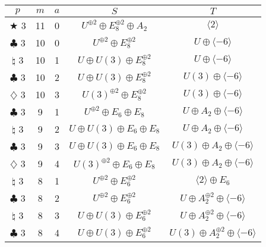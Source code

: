 \documentclass{amsart}
\theoremstyle{definition}
\begin{document}
 \begin{table}[p]
 \begin{tabular}{c|c|c|c|c}
 $p$&$m$&$a$&$S$&$T$\\
 \hline
 
 $\bigstar$ 3&11&0&$U^{\oplus 2}\oplus E_8^{\oplus 2}\oplus A_2$&$\langle 2\rangle$\\
 \hline
 
 $\clubsuit$ 3&10&0& $U^{\oplus 2} \oplus E_8^{\oplus 2}$&$U\oplus \langle -6\rangle$\\
 
 $\natural$ 3&10&1& $U \oplus U(3) \oplus E_8^{\oplus 2}$&$U\oplus \langle -6\rangle$\\
 
 $\clubsuit$ 3&10&2&$U \oplus U(3) \oplus E_8^{\oplus 2}$&$U(3)\oplus\langle -6\rangle$\\
 
 $\diamondsuit$ 3&10&3&$U(3)^{\oplus 2} \oplus E_8^{\oplus 2}$&$U(3)\oplus\langle -6\rangle$\\
 \hline
 
 $\clubsuit$ 3&9&1&$U^{\oplus 2} \oplus E_6\oplus E_8$&$U\oplus A_2\oplus \langle -6\rangle$\\
 
 $\natural$ 3&9&2&$U\oplus U(3) \oplus E_6\oplus E_8$&$U\oplus A_2\oplus \langle -6\rangle$\\
 
 $\clubsuit$ 3&9&3&$U\oplus U(3)\oplus E_6\oplus E_8$&$U(3)\oplus A_2\oplus \langle -6\rangle$\\
 
 $\diamondsuit$ 3&9&4&$U(3)^{\oplus 2}\oplus E_6\oplus E_8$&$U(3)\oplus A_2\oplus \langle -6\rangle$\\

 \hline
 
 $\natural$ 3&8&1&$U^{\oplus 2} \oplus E_6^{\oplus 2}$&$\langle 2\rangle \oplus E_6$\\
 
 $\clubsuit$ 3&8&2&$U^{\oplus 2} \oplus E_6^{\oplus 2}$&$U\oplus A_2^{\oplus 2} \oplus \langle -6\rangle$\\
 
 $\natural$ 3&8&3&$U\oplus U(3)\oplus E_6^{\oplus 2}$&$U\oplus A_2^{\oplus 2} \oplus \langle -6\rangle$\\
 
 $\clubsuit$ 3&8&4&$U\oplus U(3)\oplus E_6^{\oplus 2}$&$U(3)\oplus A_2^{\oplus 2} \oplus \langle -6\rangle$\\
 

\end{tabular}
\end{table}
\end{document}
